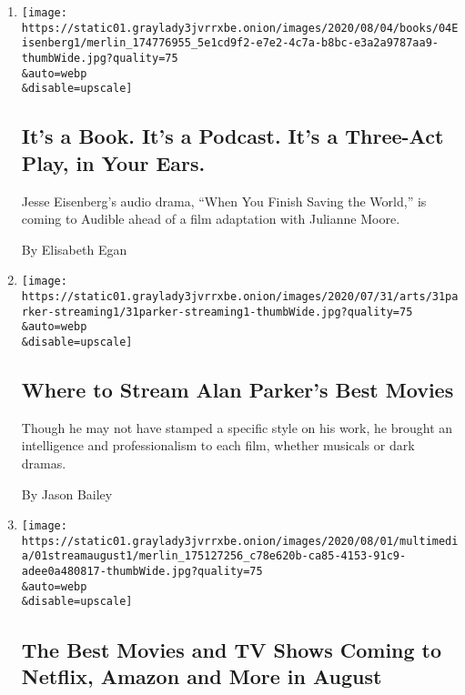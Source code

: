 \begin{enumerate}
\def\labelenumi{\arabic{enumi}.}
\item
  \href{/2020/08/02/books/jesse-eisenberg-when-you-finish-saving-the-world-audio.html}{}

  \texttt{[image: https://static01.graylady3jvrrxbe.onion/images/2020/08/04/books/04Eisenberg1/merlin\_174776955\_5e1cd9f2-e7e2-4c7a-b8bc-e3a2a9787aa9-thumbWide.jpg?quality=75\\\&auto=webp\\\&disable=upscale]}

  \hypertarget{its-a-book-its-a-podcast-its-a-three-act-play-in-your-ears}{%
  \subsection{It's a Book. It's a Podcast. It's a Three-Act Play, in
  Your
  Ears.}\label{its-a-book-its-a-podcast-its-a-three-act-play-in-your-ears}}

  Jesse Eisenberg's audio drama, ``When You Finish Saving the World,''
  is coming to Audible ahead of a film adaptation with Julianne Moore.

  By Elisabeth Egan
\item
  \href{/2020/07/31/movies/alan-parker-stream.html}{}

  \texttt{[image: https://static01.graylady3jvrrxbe.onion/images/2020/07/31/arts/31parker-streaming1/31parker-streaming1-thumbWide.jpg?quality=75\\\&auto=webp\\\&disable=upscale]}

  \hypertarget{where-to-stream-alan-parkers-best-movies}{%
  \subsection{Where to Stream Alan Parker's Best
  Movies}\label{where-to-stream-alan-parkers-best-movies}}

  Though he may not have stamped a specific style on his work, he
  brought an intelligence and professionalism to each film, whether
  musicals or dark dramas.

  By Jason Bailey
\item
  \href{/2020/07/31/arts/television/new-to-stream-netflix.html}{}

  \texttt{[image: https://static01.graylady3jvrrxbe.onion/images/2020/08/01/multimedia/01streamaugust1/merlin\_175127256\_c78e620b-ca85-4153-91c9-adee0a480817-thumbWide.jpg?quality=75\\\&auto=webp\\\&disable=upscale]}

  \hypertarget{the-best-movies-and-tv-shows-coming-to-netflix-amazon-and-more-in-august}{%
  \subsection{The Best Movies and TV Shows Coming to Netflix, Amazon and
  More in
  August}\label{the-best-movies-and-tv-shows-coming-to-netflix-amazon-and-more-in-august}}


\end{enumerate}

